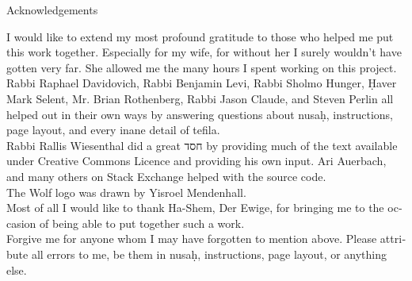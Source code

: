\documentclass[twoside, openany, parskip=half, 11pt]{book}
\begin{document}
\begin{minipage}{\textwidth}

\begin{center} %
\begin{LARGE}
Acknowledgements
\end{LARGE}
\end{center}

\begin{english}
I would like to extend my most profound gratitude to those who helped me put this work together. Especially for my wife, for without her I surely wouldn't have gotten very far. She allowed me the many hours I spent working on this project. \\


Rabbi Raphael Davidovich, Rabbi Benjamin Levi, Rabbi Sholmo Hunger, \d{H}aver Mark Selent, Mr. Brian Rothenberg, Rabbi Jason Claude, and Steven Perlin all helped out in their own ways by answering questions about nusa\d{h}, instructions, page layout, and every inane detail of tefila. \\

Rabbi Rallis Wiesenthal did a great חסד by providing much of the text available under Creative Commons Licence and providing his own input. Ari Auerbach, and many others on Stack Exchange helped with the source code. \\

The Wolf logo was drawn by Yisroel Mendenhall.\\

Most of all I would like to thank Ha-Shem, Der Ewige, for bringing me to the occasion of being able to put together such a work.\\

Forgive me for anyone whom I may have forgotten to mention above. Please attribute all errors to me, be them in nusa\d{h}, instructions, page layout, or anything else.\\

\end{english}

\end{minipage}





\renewcommand{\contentsname}{}
\tableofcontents

\clearpage


\blankpage
\end{document}
